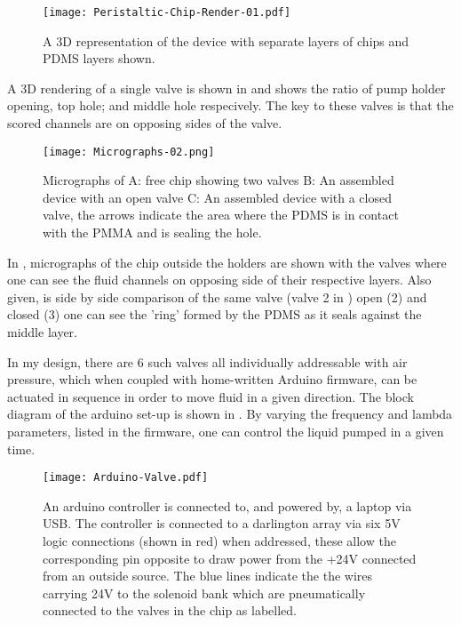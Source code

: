 \begin{figure}[h]
  \begin{center}
  \texttt{[image: Peristaltic-Chip-Render-01.pdf]}
  \caption{A 3D representation of the device with separate layers of chips and PDMS
  layers shown.}
  \label{fig:3Ddevice}
  \end{center}
\end{figure}

A 3D rendering of a single valve is shown in  and shows the ratio of pump holder opening, top hole; and middle hole respecively. The key to these valves
is that the scored channels are on opposing sides of the valve.

\begin{figure}[h]
  \begin{center}
  \texttt{[image: Micrographs-02.png]}
  \caption{Micrographs of A: free chip showing two valves B: An assembled device with an
  open valve C: An assembled device with a closed valve, the arrows indicate the area where the PDMS is
  in contact with the PMMA and is sealing the hole.}
  \label{fig:Micrographs}
  \end{center}
\end{figure}


In , micrographs of the chip outside the holders are shown with the valves
where one can see the fluid channels on opposing side of their respective layers. Also given,
is side by side comparison of the same valve (valve 2 in ) open (2) and closed
(3) one can see the 'ring' formed by the PDMS as it seals against the middle layer.

In my design, there are 6 such valves all individually addressable with air pressure, which when
coupled with home-written Arduino firmware, can be actuated in sequence in order to move
fluid in a given direction. The block diagram of the arduino set-up is shown in
. By varying the frequency and lambda parameters, listed in the
firmware, one can control the liquid pumped in a given time.

\begin{figure}[h]
  \begin{center}
  \texttt{[image: Arduino-Valve.pdf]}
  \end{center}
  \caption{An arduino controller is connected to, and powered by, a laptop via USB. The controller is connected
  to a darlington array via six 5V logic connections (shown in red) when addressed, these allow the corresponding pin
  opposite to draw power from the +24V connected from an outside source. The blue lines indicate the the wires
  carrying 24V to the solenoid bank which are pneumatically connected to the valves in the chip as labelled. }
  \label{fig:ValveSetup}
\end{figure}

